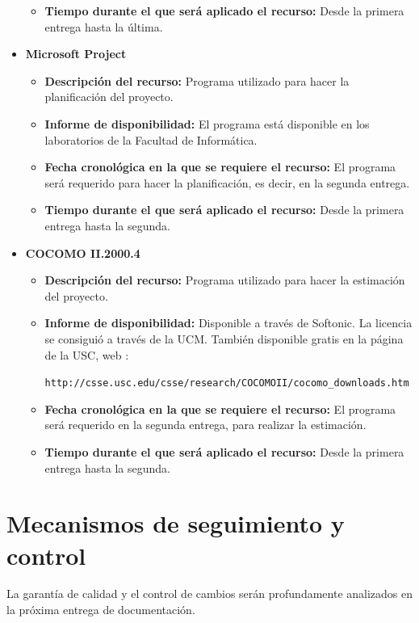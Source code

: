 \documentclass[spanish,a4paper,11pt, twoside]{report}	%
\begin{document}
\begin{itemize}
\begin{itemize}
				  	  \item \textbf{Tiempo durante el que será aplicado el recurso: }Desde la primera entrega hasta la última. 
					\end{itemize}
				\item \textbf{Microsoft Project}
				  	\begin{itemize}
				  	  \item \textbf{Descripción del recurso: } Programa utilizado para hacer la planificación del proyecto.
				  	  \item \textbf{Informe de disponibilidad: }El programa está disponible en los laboratorios de la Facultad de Informática.
				  	  \item \textbf{Fecha cronológica en la que se requiere el recurso: }El programa será requerido para hacer la planificación, es decir, en la
				  	  					segunda entrega.
				  	  \item \textbf{Tiempo durante el que será aplicado el recurso: }Desde la primera entrega hasta la segunda. 
					\end{itemize}
				\item \textbf{COCOMO II.2000.4}
				  	\begin{itemize}
				  	  \item \textbf{Descripción del recurso: } Programa utilizado para hacer la estimación del proyecto.
				  	  \item \textbf{Informe de disponibilidad: }Disponible a través de Softonic. La licencia se consiguió a través de la UCM. También disponible gratis en la página de la USC, web :

\texttt{http://csse.usc.edu/csse/research/COCOMOII/cocomo\_downloads.htm}
				  	  \item \textbf{Fecha cronológica en la que se requiere el recurso: }El programa será requerido en la segunda entrega, para
				  	  						realizar la estimación.
				  	  \item \textbf{Tiempo durante el que será aplicado el recurso: }Desde la primera entrega hasta la segunda. 
					\end{itemize}
			\end{itemize} 


\setcounter{section}{0}



\chapter{Mecanismos de seguimiento y control} La garantía de calidad y el control de cambios serán profundamente analizados en la próxima entrega de documentación.
\end{document}
